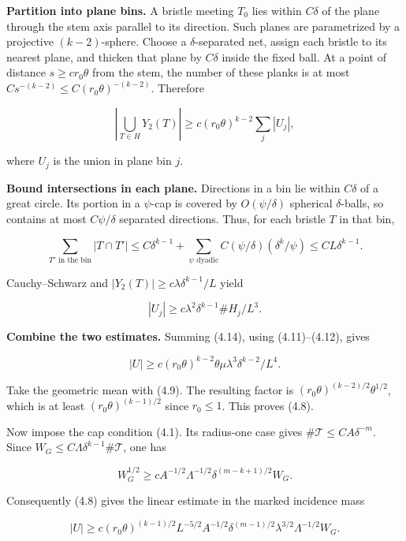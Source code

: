 \documentclass[
  11pt,
  a4paper,
]{article}
\begin{document}
\textbf{Partition into plane bins.} A bristle meeting \(T_0\) lies
within \(C\delta\) of the plane through the stem axis parallel to its
direction. Such planes are parametrized by a projective
\((k-2)\)-sphere. Choose a \(\delta\)-separated net, assign each bristle
to its nearest plane, and thicken that plane by \(C\delta\) inside the
fixed ball. At a point of distance \(s\ge cr_0\theta\) from the stem,
the number of these planks is at most
\(Cs^{-(k-2)}\le C(r_0\theta)^{-(k-2)}\). Therefore

\[\left|\bigcup_{T\in H}Y_2(T)\right|
 \ge c(r_0\theta)^{k-2}\sum_j|U_j|,
\tag{4.12}\label{eq:4.12}\]

where \(U_j\) is the union in plane bin \(j\).

\textbf{Bound intersections in each plane.} Directions in a bin lie
within \(C\delta\) of a great circle. Its portion in a \(\psi\)-cap is
covered by \(O(\psi/\delta)\) spherical \(\delta\)-balls, so contains at
most \(C\psi/\delta\) separated directions. Thus, for each bristle \(T\)
in that bin,

\[\sum_{T'\text{ in the bin}}|T\cap T'|
 \le C\delta^{k-1}
 +\sum_{\psi\text{ dyadic}}C(\psi/\delta)(\delta^k/\psi)
 \le C L\delta^{k-1}.
\tag{4.13}\label{eq:4.13}\]

Cauchy--Schwarz and \(|Y_2(T)|\ge c\lambda\delta^{k-1}/L\) yield

\[|U_j|\ge c\lambda^2\delta^{k-1}\#H_j/L^3.
\tag{4.14}\label{eq:4.14}\]

\textbf{Combine the two estimates.} Summing (4.14), using
(4.11)--(4.12), gives

\[|U|\ge c(r_0\theta)^{k-2}\theta
 \mu\lambda^3\delta^{k-2}/L^4.
\tag{4.15}\label{eq:4.15}\]

Take the geometric mean with (4.9). The resulting factor is
\((r_0\theta)^{(k-2)/2}\theta^{1/2}\), which is at least
\((r_0\theta)^{(k-1)/2}\) since \(r_0\le1\). This proves (4.8).

Now impose the cap condition (4.1). Its radius-one case gives
\(\#\mathcal T\le CA\delta^{-m}\). Since
\(W_G\le C\Lambda\delta^{k-1}\#\mathcal T\), one has

\[W_G^{1/2}\ge cA^{-1/2}\Lambda^{-1/2}
 \delta^{(m-k+1)/2}W_G.\]

Consequently (4.8) gives the linear estimate in the marked incidence
mass

\[|U|\ge c(r_0\theta)^{(k-1)/2}L^{-5/2}
 A^{-1/2}\delta^{(m-1)/2}
 \lambda^{3/2}\Lambda^{-1/2}W_G.
\tag{4.16}\label{eq:4.16}\]

\end{document}
